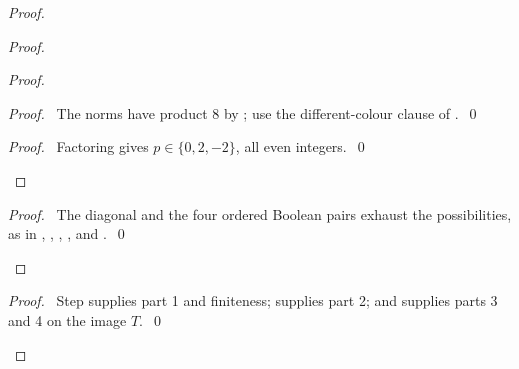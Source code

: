 \begin{mergedproofsection}
\begin{proof}
\begin{proof}
 \begin{proof}
  \begin{proof}\pf\ The norms have product 8 by ;
  use the different-colour clause of .~\qed\end{proof}
  \qedstep
  \begin{proof}\pf\ Factoring  gives
  $p\in\{0,2,-2\}$, all even integers.~\qed\end{proof}
 \end{proof}
 \qedstep
 \begin{proof}\pf\ The diagonal and the four ordered Boolean pairs
 exhaust the possibilities, as in ,
 , , ,
 and .~\qed\end{proof}
\end{proof}
\qedstep
\begin{proof}\pf\ Step  supplies part 1 and
finiteness;  supplies part 2; and
 supplies parts 3 and 4 on the image $T$.~\qed\end{proof}
\end{proof}


\end{mergedproofsection}

